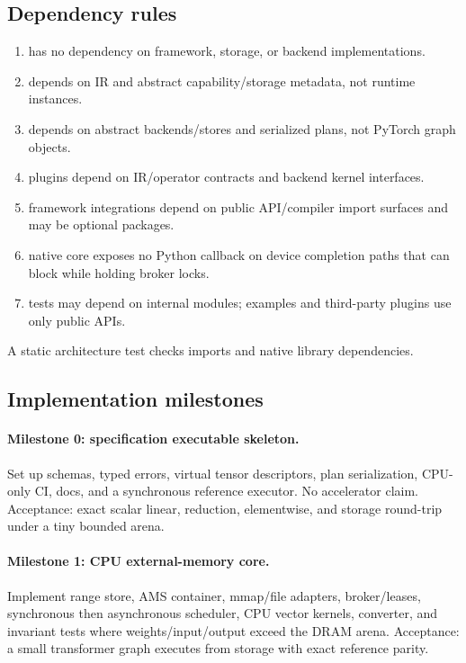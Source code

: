 \subsection{Dependency rules}

\begin{enumerate}
  \item {} has no dependency on framework, storage, or backend implementations.
  \item {} depends on IR and abstract capability/storage metadata, not runtime instances.
  \item {} depends on abstract backends/stores and serialized plans, not PyTorch graph objects.
  \item {} plugins depend on IR/operator contracts and backend kernel interfaces.
  \item framework integrations depend on public API/compiler import surfaces and may be optional packages.
  \item native core exposes no Python callback on device completion paths that can block while holding broker locks.
  \item tests may depend on internal modules; examples and third-party plugins use only public APIs.
\end{enumerate}

A static architecture test checks imports and native library dependencies.

\subsection{Implementation milestones}

\paragraph{Milestone 0: specification executable skeleton.}
Set up schemas, typed errors, virtual tensor descriptors, plan serialization, CPU-only CI, docs, and a synchronous reference executor. No accelerator claim. Acceptance: exact scalar linear, reduction, elementwise, and storage round-trip under a tiny bounded arena.

\paragraph{Milestone 1: CPU external-memory core.}
Implement range store, AMS container, mmap/file adapters, broker/leases, synchronous then asynchronous scheduler, CPU vector kernels, converter, and invariant tests where weights/input/output exceed the DRAM arena. Acceptance: a small transformer graph executes from storage with exact reference parity.

